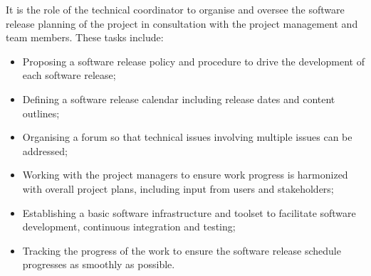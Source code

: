 \noindent It is the role of the technical coordinator to organise and oversee the software release planning of the project in consultation with the project management and team members. These tasks include:
\begin{itemize}
\item	Proposing a software release policy and procedure to drive the development of each software release;
\item	Defining a software release calendar including release dates and content outlines;
\item	Organising a forum so that technical issues involving multiple issues can be addressed;
\item	Working with the project managers to ensure work progress is harmonized with overall project plans, including input from users and stakeholders;
\item	Establishing a basic software infrastructure and toolset to facilitate software development, continuous integration and testing;
\item	Tracking the progress of the work to ensure the software release schedule progresses as smoothly as possible.
\end{itemize}